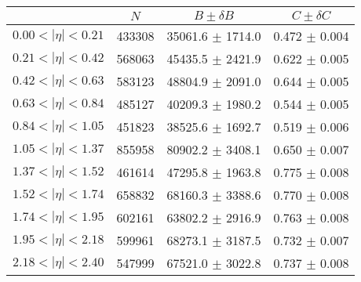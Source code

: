 \begin{tabular}{lccc}
\hline
    &   $N$   & $B \pm \delta B$  &  $C \pm \delta C$ \\
\hline
$0.00 < |\eta| <0.21$          & 433308     & 35061.6    $\pm$ 1714.0 & 0.472      $\pm$ 0.004 \\
$0.21 < |\eta| <0.42$          & 568063     & 45435.5    $\pm$ 2421.9 & 0.622      $\pm$ 0.005 \\
$0.42 < |\eta| <0.63$          & 583123     & 48804.9    $\pm$ 2091.0 & 0.644      $\pm$ 0.005 \\
$0.63 < |\eta| <0.84$          & 485127     & 40209.3    $\pm$ 1980.2 & 0.544      $\pm$ 0.005 \\
$0.84 < |\eta| <1.05$          & 451823     & 38525.6    $\pm$ 1692.7 & 0.519      $\pm$ 0.006 \\
$1.05 < |\eta| <1.37$          & 855958     & 80902.2    $\pm$ 3408.1 & 0.650      $\pm$ 0.007 \\
$1.37 < |\eta| <1.52$          & 461614     & 47295.8    $\pm$ 1963.8 & 0.775      $\pm$ 0.008 \\
$1.52 < |\eta| <1.74$          & 658832     & 68160.3    $\pm$ 3388.6 & 0.770      $\pm$ 0.008 \\
$1.74 < |\eta| <1.95$          & 602161     & 63802.2    $\pm$ 2916.9 & 0.763      $\pm$ 0.008 \\
$1.95 < |\eta| <2.18$          & 599961     & 68273.1    $\pm$ 3187.5 & 0.732      $\pm$ 0.007 \\
$2.18 < |\eta| <2.40$          & 547999     & 67521.0    $\pm$ 3022.8 & 0.737      $\pm$ 0.008 \\
\hline
\end{tabular}
